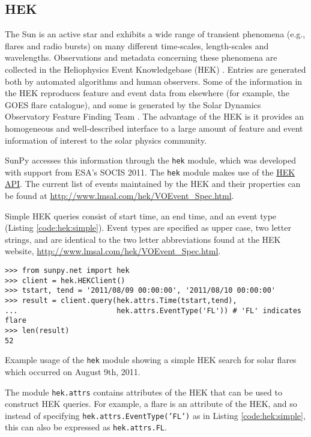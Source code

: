 \subsection{HEK}\label{ssec:hek}

The Sun is an active star and exhibits a wide range of transient phenomena 
(e.g., flares and radio bursts) on many different time-scales, length-scales and 
wavelengths. Observations and metadata concerning these phenomena are collected 
in the Heliophysics Event Knowledgebase (HEK) \citep{hek2012}.  Entries are generated both by 
automated algorithms and human observers.  Some of the information in the HEK 
reproduces feature and event data from elsewhere (for example, the GOES flare catalogue),
and some is generated by the Solar Dynamics Observatory Feature Finding Team 
\citep{martens2012}.  The advantage of the HEK is it 
provides an homogeneous and well-described interface to a large amount of 
feature and event information of interest to the solar physics community.


SunPy accesses this information through the \texttt{hek} module, which was
developed with support from ESA's SOCIS 2011.  The \texttt{hek} module makes 
use of the 
\href{http://vso.stanford.edu/hekwiki/ApplicationProgrammingInterface?action=print}{HEK
 API}.
The current list of events maintained by the HEK and their properties can be 
found at \url{http://www.lmsal.com/hek/VOEvent_Spec.html}.

Simple HEK queries consist of start time, an end time, and an event type 
(Listing \ref{code:hek:simple}). Event types are specified as upper case, 
two letter strings, and are 
identical to the two letter abbreviations found at the HEK website, 
\url{http://www.lmsal.com/hek/VOEvent_Spec.html}.

\begin{listing}[H]
\begin{verbatim}
>>> from sunpy.net import hek
>>> client = hek.HEKClient()
>>> tstart, tend = '2011/08/09 00:00:00', '2011/08/10 00:00:00'
>>> result = client.query(hek.attrs.Time(tstart,tend), 
...                       hek.attrs.EventType('FL')) # 'FL' indicates flare
>>> len(result)
52
\end{verbatim}
\caption{Example usage of the \texttt{hek} module showing a simple HEK search for solar flares
which occurred on August 9th, 2011.}
\label{code:hek:simple}
\end{listing}

The module \texttt{hek.attrs} contains attributes of the HEK that can be used to
construct HEK queries.  For example, a flare is an attribute of the HEK, and so 
instead of specifying \texttt{hek.attrs.EventType('FL')} as in Listing 
\ref{code:hek:simple}, this can also be expressed as \texttt{hek.attrs.FL}. 

